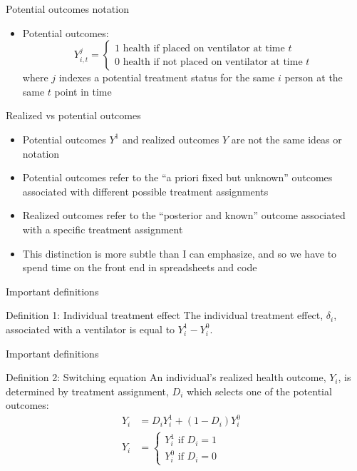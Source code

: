 \documentclass{beamer}
\begin{document}
\begin{frame}{Potential outcomes notation}

  \begin{itemize}
    \item Potential outcomes: $$Y_{i,t}^j =\begin{cases} 1 \text{ health if placed on ventilator at time $t$} \\ 0 \text{ health if not placed on ventilator at time $t$} \end{cases}$$where $j$ indexes a potential treatment status for the same $i$ person at the same $t$ point in time
  \end{itemize}
\end{frame}


\begin{frame}{Realized vs potential outcomes}

  \begin{itemize}
    \item Potential outcomes $Y^1$ and realized outcomes $Y$ are not the same ideas or notation
    \item Potential outcomes refer to the ``a priori fixed but unknown'' outcomes associated with different possible treatment assignments
    \item Realized outcomes refer to the ``posterior and known'' outcome associated with a specific treatment assignment
    \item This distinction is more subtle than I can emphasize, and so we have to spend time on the front end in spreadsheets and code
  \end{itemize}
\end{frame}

\begin{frame}{Important definitions}

    \begin{block}{Definition 1: Individual treatment effect}
      The individual treatment effect,  $\delta_i$, associated with a ventilator is equal to $Y_i^1-Y_i^0$.
    \end{block}
\end{frame}


\begin{frame}{Important definitions}


    \begin{block}{Definition 2: Switching equation}
      An individual's realized health outcome, $Y_i$, is determined by treatment assignment, $D_i$ which selects one of the potential outcomes:
      \begin{eqnarray*}
        Y_i& = D_iY^1_i+(1-D_i)Y^0_i& \\
        Y_i& = \begin{cases}
          Y^1_i\text{ if }D_i=1 \\
          Y^0_i\text{ if }D_i=0
        \end{cases}
      \end{eqnarray*}
    \end{block}

\end{frame}
\end{document}
